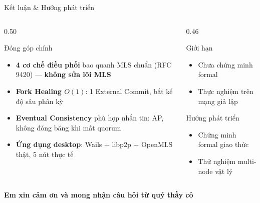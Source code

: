 \documentclass[t, aspectratio=169]{beamer}
\begin{document}
\begin{frame}[c]{Kết luận \& Hướng phát triển}
	\vspace{-0.5em}
	\begin{columns}[t]
		\begin{column}{0.50\textwidth}
			\begin{block}{Đóng góp chính}
				\small
				\begin{itemize}
					\setlength{\itemsep}{0.2em}
					\item \textbf{4 cơ chế điều phối} bao quanh MLS chuẩn (RFC 9420) --- \textbf{không sửa lõi MLS}
					\item \textbf{Fork Healing $O(1)$}: 1 External Commit, bất kể độ sâu phân kỳ
					\item \textbf{Eventual Consistency} phù hợp nhắn tin: AP, không đóng băng khi mất quorum
					\item \textbf{Ứng dụng desktop}: Wails + libp2p + OpenMLS thật, 5 nút thực tế
				\end{itemize}
			\end{block}
		\end{column}
		\begin{column}{0.46\textwidth}
			\begin{alertblock}{Giới hạn}
				\small
				\begin{itemize}
					\setlength{\itemsep}{0.15em}
					\item Chưa chứng minh formal
					\item Thực nghiệm trên mạng giả lập
				\end{itemize}
			\end{alertblock}
			\vspace{1em}
			\begin{block}{Hướng phát triển}
				\small
				\begin{itemize}
					\setlength{\itemsep}{0.2em}
					\item Chứng minh formal giao thức
					\item Thử nghiệm multi-node vật lý
				\end{itemize}
			\end{block}
		\end{column}
	\end{columns}
	\vspace{0.3em}
	\begin{center}
		\textbf{\color{hustprimary}\large Em xin cảm ơn và mong nhận câu hỏi từ quý thầy cô}
	\end{center}
\end{frame}
\end{document}
